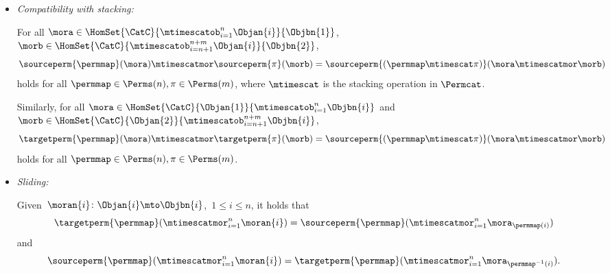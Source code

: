 \begin{ctdefinition}
\begin{itemize}
        \item \emph{Compatibility with stacking:}

              For all $\mora \in \HomSet{\CatC}{\mtimescatob_{i=1}^n \Objan{i}}{\Objbn{1}}$, $\morb \in \HomSet{\CatC}{\mtimescatob_{i=n+1}^{n+m} \Objan{i}}{\Objbn{2}}$,
              \begin{equation}
                  \sourceperm{\permmap}(\mora) \mtimescatmor \sourceperm{\pi}(\morb) =  \sourceperm{(\permmap \mtimescat \pi)}(\mora \mtimescatmor \morb)
              \end{equation}
              holds for all $\permmap \in \Perms(n), \pi \in \Perms(m)$, where $\mtimescat$ is the stacking operation in $\Permcat$.

              Similarly, for all $\mora \in \HomSet{\CatC}{\Objan{1}}{\mtimescatob_{i=1}^n \Objbn{i}} $ and $\morb \in \HomSet{\CatC}{\Objan{2}}{\mtimescatob_{i=n+1}^{n+m} \Objbn{i}}$,
              \begin{equation}
                  \targetperm{\permmap}(\mora) \mtimescatmor \targetperm{\pi}(\morb) =  \sourceperm{(\permmap \mtimescat \pi)}(\mora \mtimescatmor \morb)
              \end{equation}
              holds for all $\permmap \in \Perms(n), \pi \in \Perms(m)$.

        \item \emph{Sliding:}

              Given~$\moran{i} \colon \Objan{i} \mto \Objbn{i}$,~$1 \leq i \leq n$, it holds that
              \begin{equation}
                  \label{eq:perm-compatibility-with-stacking-1}
                  \targetperm{\permmap} ( \mtimescatmor_{i=1}^n \moran{i} ) = \sourceperm{\permmap}( \mtimescatmor_{i=1}^n \mora_{\permmap(i)} )
              \end{equation}
              and
              \begin{equation}
                  \label{eq:perm-compatibility-with-stacking-2}
                  \sourceperm{\permmap} ( \mtimescatmor_{i=1}^n \moran{i} ) = \targetperm{\permmap} ( \mtimescatmor_{i=1}^n \mora_{\permmap^{-1}(i)} ).
              \end{equation}

    \end{itemize}
\end{ctdefinition}


